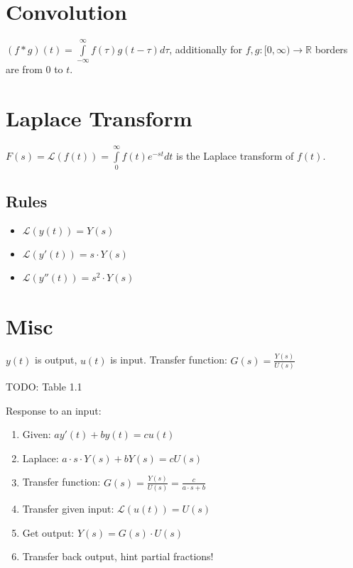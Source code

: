 \documentclass[10pt,a4paper]{article}
\begin{document}
\section*{Convolution}
$(f*g)(t) = \int\limits_{-\infty}^\infty f(\tau) g(t-\tau) d\tau$, additionally for $f, g : [0, \infty) \rightarrow \mathbb{R}$ borders are from $0$ to $t$.

\section*{Laplace Transform}
$F(s) = \mathcal{L}(f(t)) = \int\limits_0^\infty f(t) e^{-st} dt$ is the Laplace transform of $f(t)$.

\subsection{Rules}
\begin{itemize}
\item $\mathcal{L}(y(t)) = Y(s)$
\item $\mathcal{L}(y'(t)) = s \cdot Y(s)$
\item $\mathcal{L}(y''(t)) = s^2 \cdot Y(s)$
\end{itemize}

\section*{Misc}
$y(t)$ is output, $u(t)$ is input. Transfer function: $G(s) = \frac{Y(s)}{U(s)}$

TODO: Table 1.1

Response to an input:

\begin{enumerate}
\item Given: $ay'(t) + by(t) = cu(t)$
\item Laplace: $a\cdot s\cdot Y(s) + bY(s) = cU(s)$
\item Transfer function: $G(s) = \frac{Y(s)}{U(s)} = \frac{c}{a\cdot s + b}$
\item Transfer given input: $\mathcal{L}(u(t)) = U(s)$
\item Get output: $Y(s) = G(s)\cdot U(s)$
\item Transfer back output, hint partial fractions!
\end{enumerate}
\end{document}
